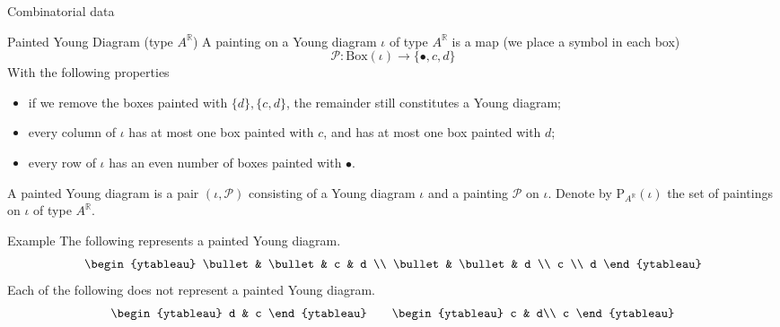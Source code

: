 \documentclass[fleqn,xcolor=dvipsnames]{beamer}
\newcommand{\BR}{{\mathbb {R}}}
\newcommand{\CP}{{\mathcal {P}}}
\begin{document}
\begin{frame}{Combinatorial data}
  \begin{block}{Painted Young Diagram (type $A^{\BR}$)}
    A painting on a Young diagram $\iota$ of type $A^{\BR}$ is a map (we place a symbol in each box)
   $$\CP : \mathrm{Box}(\iota) \to \{ \bullet, c ,d \}$$
   With the following properties

   \begin{itemize}
      \pause\item if we remove the boxes painted with $\{d\}, \{c,d\}$, the remainder still constitutes a Young diagram;
      \pause\item every column of $\iota$ has at most one box painted with $c$, and has at most one box painted with $d$;
      \pause\item every row of $\iota$ has an even number of boxes painted with $\bullet$.
   \end{itemize}
   \pause A painted Young diagram is a pair $(\iota, \CP)$ consisting of a Young diagram $\iota$ and a painting $\CP$ on $\iota$. Denote by $\mathrm{P}_{A^{\BR}}(\iota)$ the set of paintings on $\iota$ of type $A^{\BR}$.
  \end{block}
  
\end{frame}

\begin{frame}
  \begin{block}{Example}
    The following represents a painted Young diagram.
    \[
    \begin{ytableau}
        \bullet & \bullet & c & d  \\
        \bullet & \bullet & d \\
        c \\
        d
    \end{ytableau}
    \]
    \pause Each of the following does not represent a painted Young diagram.
    \[
    \begin{ytableau}
      d & c
    \end{ytableau}
    \qquad
    \begin{ytableau}
      c & d\\
      c
    \end{ytableau}
    \]
  \end{block}
  
\end{frame}
\end{document}
